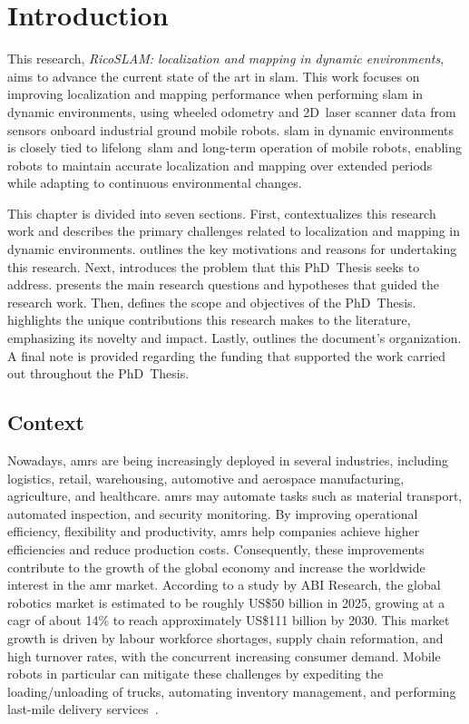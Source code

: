 \chapter{Introduction}\label{chap:intro}

This research,
\textit{RicoSLAM: localization and mapping in dynamic environments},
aims to advance the current state of the art in \gls{slam}.
This work focuses on improving localization and mapping performance when
performing \gls{slam} in dynamic environments, using wheeled odometry and 2D~laser
scanner data from sensors onboard industrial ground mobile robots.
\gls{slam} in dynamic environments is closely tied to lifelong~\gls{slam} and
long-term operation of mobile robots, enabling robots to maintain accurate
localization and mapping over extended periods while adapting to continuous
environmental changes.

This chapter is divided into seven sections.
First,  contextualizes this research work and
describes the primary challenges related to localization and mapping in dynamic
environments.
 outlines the key motivations and reasons for
undertaking this research.
Next,  introduces the problem that this PhD~Thesis
seeks to address.
 presents the main research questions and hypotheses that
guided the research work.
Then,  defines the scope and objectives of the
PhD~Thesis.
 highlights the unique contributions this
research makes to the literature, emphasizing its novelty and impact.
Lastly,  outlines the document's organization.
A final note is provided regarding the funding that supported the work carried
out throughout the PhD~Thesis.

\section{Context}\label{sec:intro:context}
Nowadays, \glspl{amr} are being increasingly deployed in
several industries, including logistics, retail, warehousing, automotive and
aerospace manufacturing, agriculture, and healthcare.
\glspl{amr} may automate tasks such as material transport, automated inspection,
and security monitoring.
By improving operational efficiency, flexibility and productivity,
\glspl{amr} help companies achieve higher efficiencies and
reduce production costs.
Consequently, these improvements contribute to the growth of the global economy
and increase the worldwide interest in the \gls{amr} market.
According to a study by ABI Research, the global robotics market is estimated to
be roughly US\$50 billion in 2025, growing at a \gls{cagr}
of about 14\% to reach approximately US\$111 billion by 2030.
This market growth is driven by labour workforce shortages, supply chain
reformation, and high turnover rates, with the concurrent increasing consumer
demand. Mobile robots in particular can mitigate these challenges by expediting
the loading/unloading of trucks, automating inventory management, and performing
last-mile delivery services~\cite{abi-research:tech-report:2025}.

